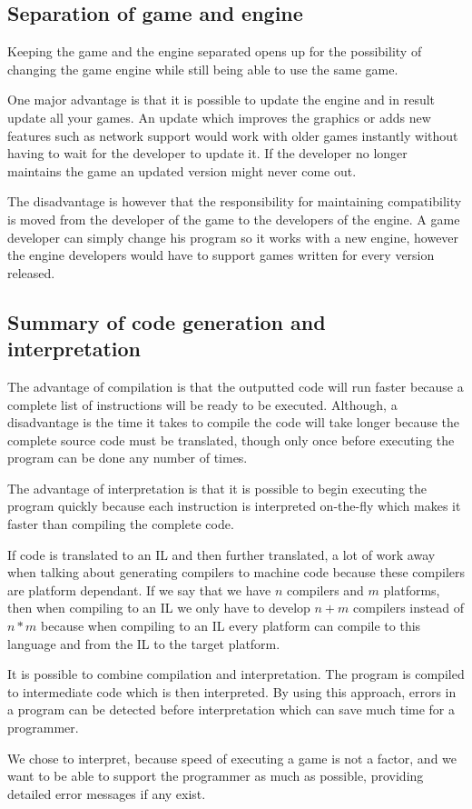 

\subsection{Separation of game and engine}
\label{subsec:engineseperation}
Keeping the game and the engine separated opens up for the possibility of
changing the game engine while still being able to use the same game. 

One major advantage is that it is possible to update the engine and in result
update all your games. An update which improves the graphics or adds new
features such as network support would work with older games instantly without
having to wait for the developer to update it. If the developer no longer
maintains the game an updated version might never come out.

The disadvantage is however that the responsibility for maintaining
compatibility is moved from the developer of the game to the developers of the
engine. A game developer can simply change his program so it works with a new
engine, however the engine developers would have to support games written for
every version released.

\subsection{Summary of code generation and interpretation}
The advantage of compilation is that the outputted code will run faster
because a complete list of instructions will be ready to be executed.
Although, a disadvantage is the time it takes to compile the code will
take longer because the complete source code must be translated, though
only once before executing the program can be done any number of times.

The advantage of interpretation is that it is possible to begin executing the
program quickly because each instruction is interpreted on-the-fly which makes
it faster than compiling the complete code. 

If code is translated to an IL and then further translated, a lot of
work away when talking about generating compilers to machine code
because these compilers are platform dependant. If we say that we have
$n$ compilers and $m$ platforms, then when compiling to an IL we only
have to develop $n+m$ compilers instead of $n*m$ because when compiling
to an IL every platform can compile to this language and from the IL to
the target platform.

It is possible to combine compilation and interpretation. The program is
compiled to intermediate code which is then interpreted. By using this approach,
errors in a program can be detected before interpretation which can save much
time for a programmer.

We chose to interpret, because speed of executing a game is not a
factor, and we want to be able to support the programmer as much as
possible, providing detailed error messages if any exist.
